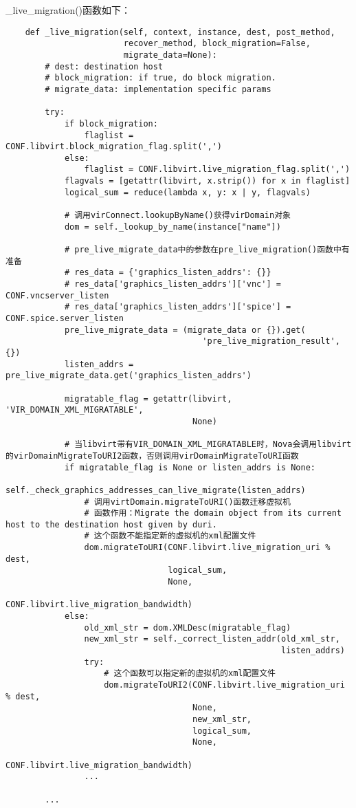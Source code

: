 \documentclass[a4paper,left=1.5cm,right=1.5cm,11pt]{article}
\begin{document}
	\_live\_migration()函数如下：
	\begin{lstlisting}
	def _live_migration(self, context, instance, dest, post_method,
                        recover_method, block_migration=False,
                        migrate_data=None):
        # dest: destination host
        # block_migration: if true, do block migration.
        # migrate_data: implementation specific params
        
        try:
            if block_migration:
                flaglist = CONF.libvirt.block_migration_flag.split(',')
            else:
                flaglist = CONF.libvirt.live_migration_flag.split(',')
            flagvals = [getattr(libvirt, x.strip()) for x in flaglist]
            logical_sum = reduce(lambda x, y: x | y, flagvals)

			# 调用virConnect.lookupByName()获得virDomain对象
            dom = self._lookup_by_name(instance["name"])

			# pre_live_migrate_data中的参数在pre_live_migration()函数中有准备
			# res_data = {'graphics_listen_addrs': {}}
        	# res_data['graphics_listen_addrs']['vnc'] = CONF.vncserver_listen
        	# res_data['graphics_listen_addrs']['spice'] = CONF.spice.server_listen
            pre_live_migrate_data = (migrate_data or {}).get(
                                        'pre_live_migration_result', {})
            listen_addrs = pre_live_migrate_data.get('graphics_listen_addrs')

            migratable_flag = getattr(libvirt, 'VIR_DOMAIN_XML_MIGRATABLE',
                                      None)
			
			# 当libvirt带有VIR_DOMAIN_XML_MIGRATABLE时，Nova会调用libvirt的virDomainMigrateToURI2函数，否则调用virDomainMigrateToURI函数
            if migratable_flag is None or listen_addrs is None:
                self._check_graphics_addresses_can_live_migrate(listen_addrs)
				# 调用virtDomain.migrateToURI()函数迁移虚拟机
				# 函数作用：Migrate the domain object from its current host to the destination host given by duri.
				# 这个函数不能指定新的虚拟机的xml配置文件
                dom.migrateToURI(CONF.libvirt.live_migration_uri % dest,
                                 logical_sum,
                                 None,
                                 CONF.libvirt.live_migration_bandwidth)
            else:
                old_xml_str = dom.XMLDesc(migratable_flag)
                new_xml_str = self._correct_listen_addr(old_xml_str,
                                                        listen_addrs)
                try:
					# 这个函数可以指定新的虚拟机的xml配置文件
                    dom.migrateToURI2(CONF.libvirt.live_migration_uri % dest,
                                      None,
                                      new_xml_str,
                                      logical_sum,
                                      None,
                                      CONF.libvirt.live_migration_bandwidth)
                ...

        ...
	\end{lstlisting}
\end{document}
